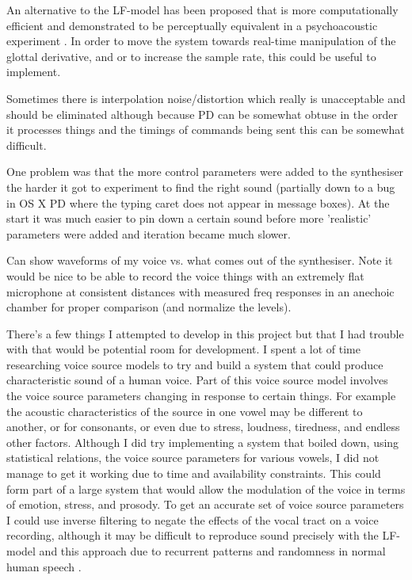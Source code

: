 An alternative to the LF-model has been proposed that is more computationally efficient and demonstrated to be perceptually equivalent in a psychoacoustic experiment \cite{Veldhuis1998}. In order to move the system towards real-time manipulation of the glottal derivative, and or to increase the sample rate, this could be useful to implement.

Sometimes there is interpolation noise/distortion which really is unacceptable and should be eliminated although because PD can be somewhat obtuse in the order it processes things and the timings of commands being sent this can be somewhat difficult.

One problem was that the more control parameters were added to the synthesiser the harder it got to experiment to find the right sound (partially down to a bug in OS X PD where the typing caret does not appear in message boxes). At the start it was much easier to pin down a certain sound before more 'realistic' parameters were added and iteration became much slower.

Can show waveforms of my voice vs. what comes out of the synthesiser. Note it would be nice to be able to record the voice things with an extremely flat microphone at consistent distances with measured freq responses in an anechoic chamber for proper comparison (and normalize the levels).

There's a few things I attempted to develop in this project but that I had trouble with that would be potential room for development. I spent a lot of time researching voice source models to try and build a system that could produce characteristic sound of a human voice. Part of this voice source model involves the voice source parameters changing in response to certain things. For example the acoustic characteristics of the source in one vowel may be different to another, or for consonants, or even due to stress, loudness, tiredness, and endless other factors. Although I did try implementing a system that boiled down, using statistical relations, the voice source parameters for various vowels, I did not manage to get it working due to time and availability constraints. 
This could form part of a large system that would allow the modulation of the voice in terms of emotion, stress, and prosody.
To get an accurate set of voice source parameters I could use inverse filtering to negate the effects of the vocal tract on a voice recording, although it may be difficult to reproduce sound precisely with the LF-model and this approach due to recurrent patterns and randomness in normal human speech \cite{Fant1995}.

